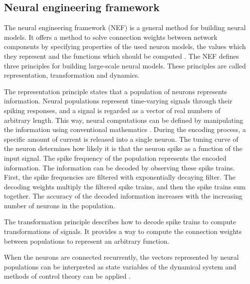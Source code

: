 \subsection{Neural engineering framework}
The neural engineering framework (NEF) is a general method for building neural models. It offers a method to solve connection weights between network components by specifying properties of the used neuron models, the values which they represent and the functions which should be computed \cite{stewartTechnicalOverviewNeural2012}. The NEF defines three principles for building large-scale neural models. These principles are called representation, transformation and dynamics. \par
The representation principle states that a population of neurons represents information. Neural populations represent time-varying signals through their spiking responses, and a signal is regarded as a vector of real numbers of arbitrary length.  This way, neural computations can be defined by manipulating the information using conventional mathematics \cite{bekolayNengoPythonTool2014}. During the encoding process, a specific amount of current is released into a single neuron. The tuning curve of the neuron determines how likely it is that the neuron spike as a function of the input signal. The spike frequency of the population represents the encoded information. The information can be decoded by observing these spike trains. First, the spike frequencies are filtered with exponentially decaying filter. The decoding weights multiply the filtered spike trains, and then the spike trains sum together. The accuracy of the decoded information increases with the increasing number of neurons in the population. \par
The transformation principle describes how to decode spike trains to compute transformations of signals. It provides a way to compute the connection weights between populations to represent an arbitrary function. \par
When the neurons are connected recurrently, the vectors represented by neural populations can be interpreted as state variables of the dynamical system and methods of control theory can be applied \cite{bekolayNengoPythonTool2014}.

